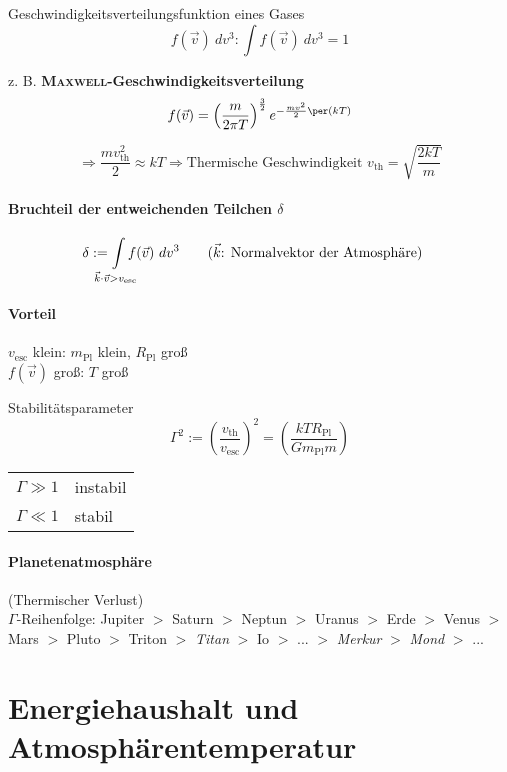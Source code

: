 Geschwindigkeitsverteilungsfunktion eines Gases
\[ f(\vec v)\ dv^3: \int f (\vec v)\ dv^3 = 1 \tag{Normierung} \]

z. B. \textbf{\textsc{Maxwell}-Geschwindigkeitsverteilung}
\[ f(\vec v) = \left(\frac{m}{2 \pi T}\right)^{\frac{3}{2}} e^{-\frac{mv^2}{2} \per (k T)} \]

\[ \Rightarrow \frac{m v_{\mathrm{th}}^2}{2} \approx kT \Rightarrow \text{Thermische Geschwindigkeit $v_{\mathrm{th}} = \sqrt{\dfrac{2 k T}{m}}$}\]

\paragraph{Bruchteil der entweichenden Teilchen $\delta$}
\begin{align*}
    \delta &:= \int\limits_{\mathclap{\vec k \cdot \vec v > v_{\mathrm{esc}}}} f(\vec v)\ dv^3 \tag{$\vec k$: Normalvektor der Atmosphäre}
\end{align*}

\paragraph{Vorteil} $v_{\mathrm{esc}}$ klein: $m_{\mathrm{Pl}}$ klein, $R_{\mathrm{Pl}}$ groß \\
    $f(\vec v)$ groß: $T$ groß

\begin{definition}
    Stabilitätsparameter
    \[ \Gamma^2 := \left(\frac{v_{\mathrm{th}}}{v_{\mathrm{esc}}}\right)^2 = \left(\frac{kTR_{\mathrm{Pl}}}{G m_{\mathrm{Pl}} m}\right) \]
    \begin{tabular}{r@{:\ }l}
        $\Gamma \gg 1$ & instabil \\
        $\Gamma \ll 1$ & stabil
    \end{tabular}
\end{definition}

\paragraph{Planetenatmosphäre} (Thermischer Verlust) \\
$\Gamma$-Reihenfolge: Jupiter $>$ Saturn $>$ Neptun $>$ Uranus $>$ Erde $>$
Venus $>$ Mars $>$ Pluto $>$ Triton $>$ \emph{Titan} $>$ Io $>$ ... $>$ \emph{Merkur}
$>$ \emph{Mond} $>$ ...

\section{Energiehaushalt und Atmosphärentemperatur}
